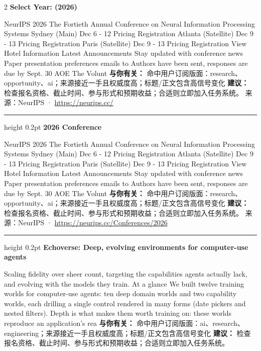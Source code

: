 \documentclass[10.5pt]{ctexart}
\begin{document}
\begin{multicols}{2}
{\large\bfseries Select Year: (2026)}\par
NeurIPS 2026 The Fortieth Annual Conference on Neural Information Processing Systems Sydney (Main) Dec 6 - 12 Pricing Registration Atlanta (Satellite) Dec 9 - 13 Pricing Registration Paris (Satellite) Dec 9 - 13 Pricing Registration View Hotel Information Latest Announcements Stay updated with conference news Paper presentation preferences emails to Authors have been sent, responses are due by Sept. 30 AOE The Volunt
\textbf{与你有关：} 命中用户订阅版面：research、opportunity、ai；来源接近一手且权威度高；标题/正文包含高信号变化
\textbf{建议：} 检查报名资格、截止时间、参与形式和预期收益；合适则立即加入任务系统。
{\footnotesize\color{ormuted} 来源：NeurIPS · \url{https://neurips.cc/}}
\vspace{2mm}
\hrule height 0.2pt
\vspace{2mm}
{\large\bfseries 2026 Conference}\par
NeurIPS 2026 The Fortieth Annual Conference on Neural Information Processing Systems Sydney (Main) Dec 6 - 12 Pricing Registration Atlanta (Satellite) Dec 9 - 13 Pricing Registration Paris (Satellite) Dec 9 - 13 Pricing Registration View Hotel Information Latest Announcements Stay updated with conference news Paper presentation preferences emails to Authors have been sent, responses are due by Sept. 30 AOE The Volunt
\textbf{与你有关：} 命中用户订阅版面：research、opportunity、ai；来源接近一手且权威度高；标题/正文包含高信号变化
\textbf{建议：} 检查报名资格、截止时间、参与形式和预期收益；合适则立即加入任务系统。
{\footnotesize\color{ormuted} 来源：NeurIPS · \url{https://neurips.cc/Conferences/2026}}
\vspace{2mm}
\hrule height 0.2pt
\vspace{2mm}
{\large\bfseries Echoverse: Deep, evolving environments for computer-use agents}\par
Scaling fidelity over sheer count, targeting the capabilities agents actually lack, and evolving with the models they train. At a glance We built twelve training worlds for computer-use agents: ten deep domain worlds and two capability worlds, each drilling a single control rendered in many forms (date pickers and nested filters). Depth is what makes them worth training on: these worlds reproduce an application’s rea
\textbf{与你有关：} 命中用户订阅版面：ai、research、engineering；来源接近一手且权威度高；标题/正文包含高信号变化
\textbf{建议：} 检查报名资格、截止时间、参与形式和预期收益；合适则立即加入任务系统。

\end{multicols}
\end{document}
